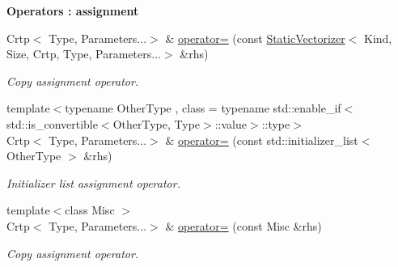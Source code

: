 \begin{Indent}{\bf Operators \-: assignment}\par
\begin{DoxyCompactItemize}
\item 
Crtp$<$ Type, Parameters...$>$ \& \hyperlink{classmagrathea_1_1StaticVectorizer_a53c433b861ee583956eeed639868cda0}{operator=} (const \hyperlink{classmagrathea_1_1StaticVectorizer}{Static\-Vectorizer}$<$ Kind, Size, Crtp, Type, Parameters...$>$ \&rhs)
\begin{DoxyCompactList}\small\item\em Copy assignment operator. \end{DoxyCompactList}\item 
{\footnotesize template$<$typename Other\-Type , class  = typename std\-::enable\-\_\-if$<$std\-::is\-\_\-convertible$<$\-Other\-Type, Type$>$\-::value$>$\-::type$>$ }\\Crtp$<$ Type, Parameters...$>$ \& \hyperlink{classmagrathea_1_1StaticVectorizer_aa0f365bb136ebe481ebadbc939379300}{operator=} (const std\-::initializer\-\_\-list$<$ Other\-Type $>$ \&rhs)
\begin{DoxyCompactList}\small\item\em Initializer list assignment operator. \end{DoxyCompactList}\item 
{\footnotesize template$<$class Misc $>$ }\\Crtp$<$ Type, Parameters...$>$ \& \hyperlink{classmagrathea_1_1StaticVectorizer_a7f80b1a26224671bcc94082b329703d0}{operator=} (const Misc \&rhs)
\begin{DoxyCompactList}\small\item\em Copy assignment operator. \end{DoxyCompactList}\end{DoxyCompactItemize}
\end{Indent}
